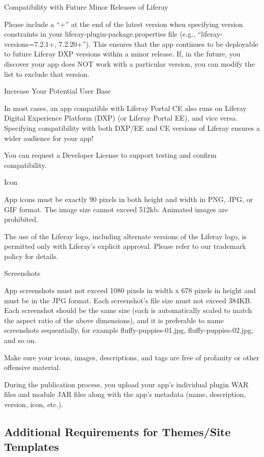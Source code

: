 Compatibility with Future Minor Releases of Liferay

Please include a ``+'' at the end of the latest version when specifying
version constraints in your liferay-plugin-package.properties file
(e.g., ``liferay-versions=7.2.1+, 7.2.20+''). This ensures that the app
continues to be deployable to future Liferay DXP versions within a minor
release. If, in the future, you discover your app does NOT work with a
particular version, you can modify the list to exclude that version.

Increase Your Potential User Base

In most cases, an app compatible with Liferay Portal CE also runs on
Liferay Digital Experience Platform (DXP) (or Liferay Portal EE), and
vice versa. Specifying compatibility with both DXP/EE and CE versions of
Liferay ensures a wider audience for your app!

You can request a Developer License to support testing and confirm
compatibility.

Icon

App icons must be exactly 90 pixels in both height and width in PNG,
JPG, or GIF format. The image size cannot exceed 512kb. Animated images
are prohibited.

The use of the Liferay logo, including alternate versions of the Liferay
logo, is permitted only with Liferay's explicit approval. Please refer
to our trademark policy for details.

Screenshots

App screenshots must not exceed 1080 pixels in width x 678 pixels in
height and must be in the JPG format. Each screenshot's file size must
not exceed 384KB. Each screenshot should be the same size (each is
automatically scaled to match the aspect ratio of the above dimensions),
and it is preferable to name screenshots sequentially, for example
fluffy-puppies-01.jpg, fluffy-puppies-02.jpg, and so on.

Make sure your icons, images, descriptions, and tags are free of
profanity or other offensive material.

During the publication process, you upload your app's individual plugin
WAR files and module JAR files along with the app's metadata (name,
description, version, icon, etc.).

\subsection{Additional Requirements for Themes/Site
Templates}\label{additional-requirements-for-themessite-templates}

